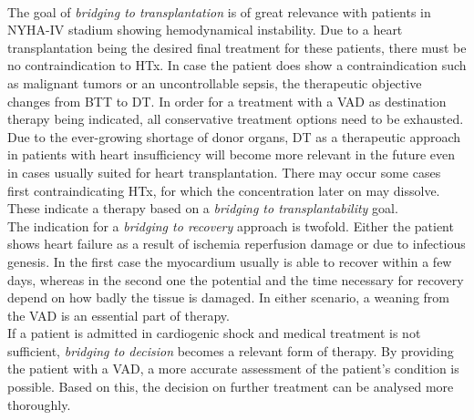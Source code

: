 \\The goal of \textit{bridging to transplantation} is of great relevance with patients in NYHA-IV stadium showing hemodynamical instability. Due to a heart transplantation being the desired final treatment for these patients, there must be no contraindication to HTx. In case the patient does show a contraindication such as malignant tumors or an uncontrollable sepsis, the therapeutic objective changes from BTT to DT. In order for a treatment with a VAD as destination therapy being indicated, all conservative treatment options need to be exhausted. Due to the ever-growing shortage of donor organs, DT as a therapeutic approach in patients with heart insufficiency will become more relevant in the future even in cases usually suited for heart transplantation. \cite{VAD7} There may occur some cases first contraindicating HTx, for which the concentration later on may dissolve. These indicate a therapy based on a \textit{bridging to transplantability} goal. \cite{VAD6}
\\The indication for a \textit{bridging to recovery} approach is twofold. Either the patient shows heart failure as a result of ischemia reperfusion damage or due to infectious genesis. In the first case the myocardium usually is able to recover within a few days, whereas in the second one the potential and the time necessary for recovery depend on how badly the tissue is damaged. In either scenario, a weaning from the VAD is an essential part of therapy. \cite{VAD7}
\\If a patient is admitted in cardiogenic shock and medical treatment is not sufficient, \textit{bridging to decision} becomes a relevant form of therapy. By providing the patient with a VAD, a more accurate assessment of the patient's condition is possible.
Based on this, the decision on further treatment can be analysed more thoroughly. \cite{VAD6}


